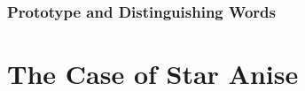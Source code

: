 
\subsubsection{Prototype and Distinguishing Words}




\section{The Case of Star Anise}
\label{sec:case_star_anise}

